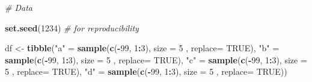 \documentclass[
]{book}
\newenvironment{Shaded}{\begin{snugshade}}{\end{snugshade}}
\newcommand{\AttributeTok}[1]{\textcolor[rgb]{0.13,0.29,0.53}{#1}}
\newcommand{\CommentTok}[1]{\textcolor[rgb]{0.56,0.35,0.01}{\textit{#1}}}
\newcommand{\ConstantTok}[1]{\textcolor[rgb]{0.56,0.35,0.01}{#1}}
\newcommand{\DecValTok}[1]{\textcolor[rgb]{0.00,0.00,0.81}{#1}}
\newcommand{\FunctionTok}[1]{\textcolor[rgb]{0.13,0.29,0.53}{\textbf{#1}}}
\newcommand{\NormalTok}[1]{#1}
\newcommand{\OtherTok}[1]{\textcolor[rgb]{0.56,0.35,0.01}{#1}}
\newcommand{\SpecialCharTok}[1]{\textcolor[rgb]{0.81,0.36,0.00}{\textbf{#1}}}
\newcommand{\StringTok}[1]{\textcolor[rgb]{0.31,0.60,0.02}{#1}}
\begin{document}
\begin{Shaded}
\begin{Highlighting}[]
\CommentTok{\# Data}

\FunctionTok{set.seed}\NormalTok{(}\DecValTok{1234}\NormalTok{) }\CommentTok{\# for reproducibility}

\NormalTok{df }\OtherTok{\textless{}{-}} \FunctionTok{tibble}\NormalTok{(}\StringTok{"a"} \OtherTok{=} \FunctionTok{sample}\NormalTok{(}\FunctionTok{c}\NormalTok{(}\SpecialCharTok{{-}}\DecValTok{99}\NormalTok{, }\DecValTok{1}\SpecialCharTok{:}\DecValTok{3}\NormalTok{), }\AttributeTok{size =} \DecValTok{5}\NormalTok{ , }\AttributeTok{replace=} \ConstantTok{TRUE}\NormalTok{),}
             \StringTok{"b"} \OtherTok{=} \FunctionTok{sample}\NormalTok{(}\FunctionTok{c}\NormalTok{(}\SpecialCharTok{{-}}\DecValTok{99}\NormalTok{, }\DecValTok{1}\SpecialCharTok{:}\DecValTok{3}\NormalTok{), }\AttributeTok{size =} \DecValTok{5}\NormalTok{ , }\AttributeTok{replace=} \ConstantTok{TRUE}\NormalTok{),}
             \StringTok{"c"} \OtherTok{=} \FunctionTok{sample}\NormalTok{(}\FunctionTok{c}\NormalTok{(}\SpecialCharTok{{-}}\DecValTok{99}\NormalTok{, }\DecValTok{1}\SpecialCharTok{:}\DecValTok{3}\NormalTok{), }\AttributeTok{size =} \DecValTok{5}\NormalTok{ , }\AttributeTok{replace=} \ConstantTok{TRUE}\NormalTok{),}
             \StringTok{"d"} \OtherTok{=} \FunctionTok{sample}\NormalTok{(}\FunctionTok{c}\NormalTok{(}\SpecialCharTok{{-}}\DecValTok{99}\NormalTok{, }\DecValTok{1}\SpecialCharTok{:}\DecValTok{3}\NormalTok{), }\AttributeTok{size =} \DecValTok{5}\NormalTok{ , }\AttributeTok{replace=} \ConstantTok{TRUE}\NormalTok{))}
\end{Highlighting}
\end{Shaded}

\begin{Shaded}
\end{Shaded}
\end{document}
